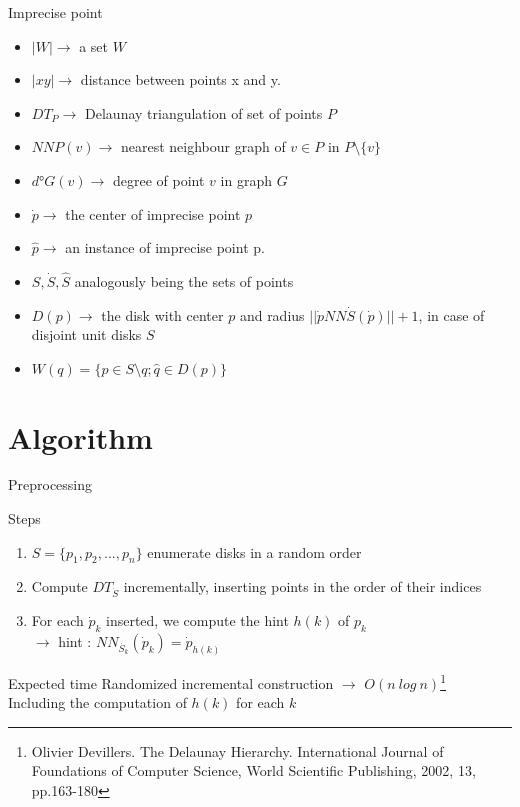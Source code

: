 \documentclass{beamer}
\begin{document}
\begin{frame}{Imprecise point}
\begin{itemize}
\item $|W| \rightarrow $ a set $W$
\item $|xy| \rightarrow $ distance between points x and y.
\item $DT_P \rightarrow $ Delaunay triangulation of set of points $P$
\item $NNP(v) \rightarrow $ nearest neighbour graph of $v \in P$ in $P \setminus \{v\}$
\item $d°G(v) \rightarrow $ degree of point $v$ in graph $G$
\item $\dot{p} \rightarrow $ the center of imprecise point $p$
\item $\hat{p} \rightarrow $ an instance of imprecise point p.
\item $S, \dot{S}, \hat{S} $ analogously being the sets of points 
\item $D(p) \rightarrow $ the disk with center $p$ and radius $||\dot{p} NN\dot{S}(\dot{p})|| + 1$, in case of disjoint unit disks $S$
\item $W(q) = \{p \in S \setminus {q}; \hat{q} \in D(p)\}$ 
\end{itemize}

\end{frame}


\section{Algorithm}
\frame{\tableofcontents[currentsubsection]}
\begin{frame}{Preprocessing}

  \begin{block}{Steps}
    \begin{enumerate}
     \item $S = \{p_1,p_2,...,p_n\}$ enumerate disks in a random order
     \item Compute $DT_{\dot{S}}$ incrementally, inserting points in the order of their indices
     \item For each $\dot{p}_k$ inserted, we compute the hint $h(k)$ of $p_k$ \\
     $\rightarrow$ hint : $NN_{\dot{S_k}}(\dot{p}_k) = \dot{p}_{h(k)}$
    \end{enumerate}
  \end{block}

  \begin{block}{Expected time}
    Randomized incremental construction $\rightarrow$ $O(n~log~n)$\footnote{Olivier Devillers. The Delaunay Hierarchy. International Journal of Foundations of Computer Science, World Scientific Publishing, 2002, 13, pp.163-180} \\
    Including the computation of $h(k)$ for each $k$
  \end{block}
  
  
\end{frame}
\end{document}
